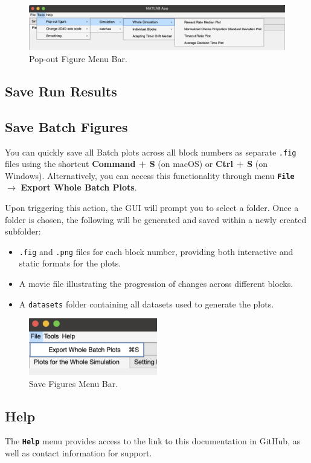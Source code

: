 \begin{figure}[H]
    \centering
    \includegraphics[width=\textwidth]{figs/popout_menu_image.png}
    \caption{Pop-out Figure Menu Bar.}
    \label{fig:popout_fig}
\end{figure}

\subsection{Save Run Results}

\subsection{Save Batch Figures}

You can quickly save all Batch plots across all block numbers as separate \texttt{.fig} files using the shortcut \textbf{Command + S} (on macOS) or \textbf{Ctrl + S} (on Windows).
Alternatively, you can access this functionality through menu \textbf{\texttt{File}} $\rightarrow$ \textbf{Export Whole Batch Plots}.

Upon triggering this action, the GUI will prompt you to select a folder. Once a folder is chosen, the following will be generated and saved within a newly created subfolder:

\begin{itemize}
\item \texttt{.fig} and \texttt{.png} files for each block number, providing both interactive and static formats for the plots.
\item A movie file illustrating the progression of changes across different blocks.
\item A \texttt{datasets} folder containing all datasets used to generate the plots.
\end{itemize}

\begin{figure}[H]
    \centering
    \includegraphics[width=0.5\textwidth]{figs/save.png}
    \caption{Save Figures Menu Bar.}
    \label{fig:save}
\end{figure}

\subsection{Help}
The \textbf{\texttt{Help}} menu provides access to the link to this documentation in GitHub, as well as contact information for support.